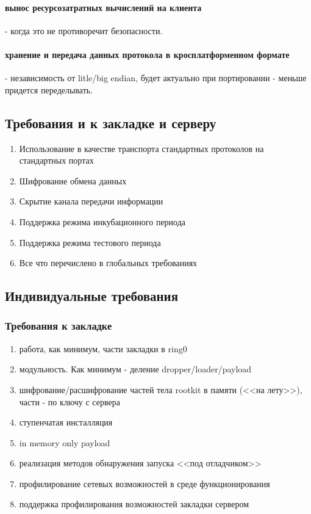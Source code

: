 \paragraph{вынос ресурсозатратных вычислений на клиента} - когда это не противоречит безопасности.

\paragraph{хранение и передача данных протокола в кросплатформенном формате} - независимость от
litle/big endian, будет актуально при портировании - меньше придется переделывать.

\newpage
\subsection{Требования и к закладке и серверу}

\begin{enumerate}
\item{Использование в качестве транспорта стандартных протоколов на стандартных портах}
\item{Шифрование обмена данных}
\item{Скрытие канала передачи информации}
\item{Поддержка режима инкубационного периода}
\item{Поддержка режима тестового периода}
\item{Все что перечислено в глобальных требованиях}
\end{enumerate}

\newpage
\subsection{Индивидуальные требования}

\subsubsection{Требования к закладке}

\begin{enumerate}
\item{работа, как минимум, части закладки в ring0}
\item{модульность. Как минимум - деление dropper/loader/payload}
\item{шифрование/расшифрование частей тела rootkit в памяти (<<на лету>>), части - по ключу с сервера}
\item{ступенчатая инсталляция}
\item{in memory only payload}
\item{реализация методов обнаружения запуска <<под отладчиком>>}
\item{профилирование сетевых возможностей в среде функционирования}
\item{поддержка профилирования возможностей закладки сервером}
\end{enumerate}

